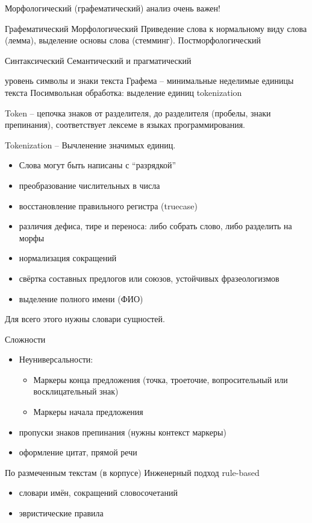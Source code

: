 \documentclass[a4paper]{article}
\newcommand{\eng}[1]{\foreignlanguage{english}{#1}}
\begin{document}


Морфологический (графематический) анализ очень важен!


Графематический
Морфологический
	Приведение слова к нормальному виду слова (лемма), выделение основы слова (стемминг).
Постморфологический

Синтаксический
Семантический и прагматический

уровень символы и знаки текста
Графема -- минимальные неделимые единицы текста
Посимвольная обработка: выделение единиц \eng{tokenization}

\eng{Token} -- цепочка знаков от разделителя, до разделителя (пробелы, знаки препинания), соответствует лексеме в языках программирования.

\eng{Tokenization} -- Вычленение значимых единиц.

\begin{itemize}
	\item Слова могут быть написаны с ``разрядкой''
	\item преобразование числительных в числа
	\item восстановление правильного регистра (\eng{truecase})
	\item различия дефиса, тире и переноса: либо собрать слово, либо разделить на морфы
	\item нормализация сокращений
	\item свёртка составных предлогов или союзов, устойчивых фразеологизмов
	\item выделение полного имени (ФИО)
\end{itemize}
Для всего этого нужны словари сущностей.

Сложности
\begin{itemize}
	\item Неуниверсальности:
	\begin{itemize}
		\item Маркеры конца предложения (точка, троеточие, вопросительный или восклицательный знак)
		\item Маркеры начала предложения
	\end{itemize}
	\item пропуски знаков препинания (нужны контекст маркеры)
	\item оформление цитат, прямой речи
\end{itemize}

По размеченным текстам (в корпусе)
Инженерный подход \eng{rule-based}
\begin{itemize}
	\item словари имён, сокращений словосочетаний
	\item эвристические правила
\end{itemize}
\end{document}
